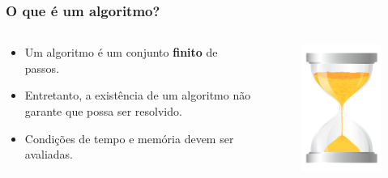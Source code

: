 \documentclass[12pt]{beamer}
\newcommand{\duascolunas}[2]{
  \begin{columns}
    \begin{column}{0.72\textwidth}
      #1
    \end{column}
    \begin{column}{0.28\textwidth}
		#2
	\end{column}
  \end{columns}
}
\begin{document}
\begin{frame}[t]
    \frametitle{O que é um algoritmo?}
    \duascolunas{\begin{itemize}
            \item Um algoritmo é um conjunto \textbf{finito} de passos.
            \item Entretanto, a existência de um algoritmo não garante que possa ser resolvido.
            \item  Condições de tempo e memória devem ser avaliadas.
        \end{itemize}}{\begin{figure}[h]
            \centering
            \includegraphics[width=1\textwidth]{Ampulheta}
        \end{figure}}
\end{frame}
\end{document}
